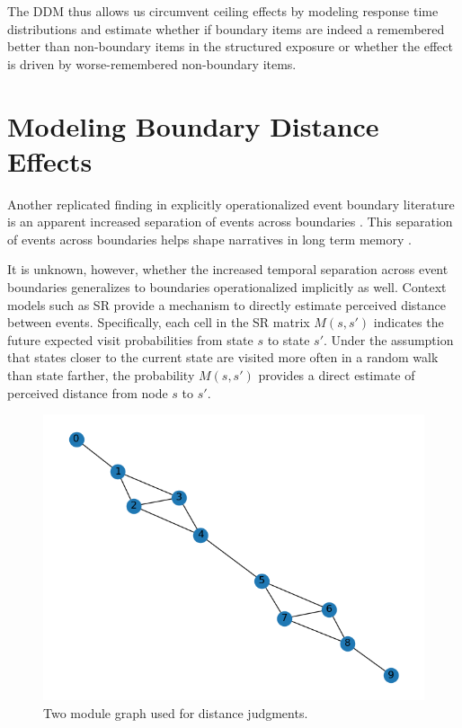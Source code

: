 The DDM thus allows us circumvent ceiling effects by modeling response time distributions and estimate whether if boundary items are indeed a remembered better than non-boundary items in the structured exposure or whether the effect is driven by worse-remembered non-boundary items. 



\section{Modeling Boundary Distance Effects}
Another replicated finding in explicitly operationalized event boundary literature is an apparent increased separation of events across boundaries \cite{horner2016role,brunec2018boundaries,dubrow2013influence, ezzyat2011constitutes, heusser2018perceptual}. This separation of events across boundaries helps shape narratives in long term memory \cite{clewett2019transcending}.

It is unknown, however, whether the increased temporal separation across event boundaries generalizes to boundaries operationalized implicitly as well. Context models such as SR provide a mechanism to directly estimate perceived distance between events. Specifically, each cell in the SR matrix $M(s, s')$ indicates the future expected visit probabilities from state $s$ to state $s'$. Under the assumption that states closer to the current state are visited more often in a random walk than state farther, the probability $M(s, s')$ provides a direct estimate of perceived distance from node $s$ to $s'$. 

\begin{figure}[ht]
    \centering
    \label{fig:two_module_graph}
    \includegraphics[width = \textwidth]{chapter_notebooks/chapter_3/figures/two_module_graph.png}
    \caption{Two module graph used for distance judgments.}
\end{figure}

